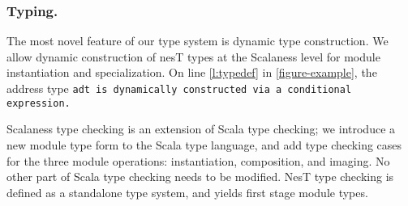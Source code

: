 \subsubsection{Typing.} 

The most novel feature of our type system is dynamic type construction. We allow dynamic
construction of nesT types at the Scalaness level for module instantiation and specialization.
On line \ref{l:typedef} in \autoref{figure-example}, the address type \tt{adt} is dynamically
constructed via a conditional expression.

Scalaness type checking is an extension of Scala type checking; we introduce a new module type
form to the Scala type language, and add type checking cases for the three module operations:
instantiation, composition, and imaging. No other part of Scala type checking needs to be
modified. NesT type checking is defined as a standalone type system, and yields first stage
module types.

%



